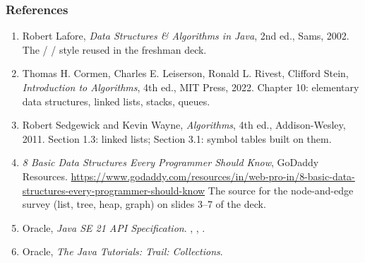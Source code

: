 \documentclass[aspectratio=169,10pt,compress]{beamer}
\begin{document}
\begin{frame}[t,fragile] \frametitle{References}
  \begin{enumerate}\small
    \item Robert Lafore, \emph{Data Structures \& Algorithms in Java},
          2nd ed., Sams, 2002.
          \newline
          The  /  / 
          style reused in the freshman deck.
    \item Thomas H. Cormen, Charles E. Leiserson, Ronald L. Rivest,
          Clifford Stein, \emph{Introduction to Algorithms}, 4th ed.,
          MIT Press, 2022.
          \newline
          Chapter 10: elementary data structures, linked lists,
          stacks, queues.
    \item Robert Sedgewick and Kevin Wayne, \emph{Algorithms},
          4th ed., Addison-Wesley, 2011.
          \newline
          Section 1.3: linked lists; Section 3.1: symbol tables
          built on them.
    \item \emph{8 Basic Data Structures Every Programmer Should Know},
          GoDaddy Resources.
          \newline
          \url{https://www.godaddy.com/resources/in/web-pro-in/8-basic-data-structures-every-programmer-should-know}
          \newline
          The source for the node-and-edge survey (list, tree,
          heap, graph) on slides 3--7 of the deck.
    \item Oracle, \emph{Java SE 21 API Specification}.
          \newline
          , ,
          .
    \item Oracle, \emph{The Java Tutorials: Trail: Collections}.
  \end{enumerate}
\end{frame}




\begin{frame}[t,fragile]
  \begin{center}
    \vspace{4cm}
  \end{center}
\end{frame}
\end{document}
